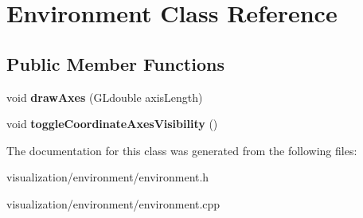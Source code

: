 \section{\-Environment \-Class \-Reference}
\label{d0/d98/classEnvironment}
\subsection*{\-Public \-Member \-Functions}
\begin{DoxyCompactItemize}
\item 
void {\bfseries draw\-Axes} (\-G\-Ldouble axis\-Length)\label{d0/d98/classEnvironment_aec8782b0e0548ff5b18091b2468edda3}

\item 
void {\bfseries toggle\-Coordinate\-Axes\-Visibility} ()\label{d0/d98/classEnvironment_a4cba1d0fd57a2e197079410e96414c07}

\end{DoxyCompactItemize}


\-The documentation for this class was generated from the following files\-:\begin{DoxyCompactItemize}
\item 
visualization/environment/environment.\-h\item 
visualization/environment/environment.\-cpp\end{DoxyCompactItemize}
